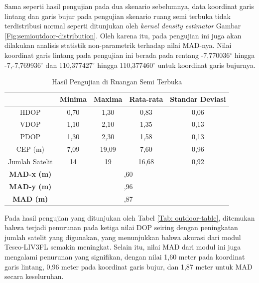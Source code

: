 Sama seperti hasil pengujian pada dua skenario sebelumnya, data koordinat garis lintang dan garis bujur pada pengujian skenario ruang semi terbuka tidak terdistribusi normal seperti ditunjukan oleh \textit{kernel density estimator} Gambar \ref{Fig:semioutdoor-distribution}. Oleh karena itu, pada pengujian ini juga akan dilakukan analisis statistik non-parametrik terhadap nilai MAD-nya. Nilai koordinat garis lintang pada pengujian ini berada pada rentang -7,770036$^{\circ}$ hingga -7,-7,769936$^{\circ}$ dan 110,377427$^{\circ}$ hingga 110,377460$^{\circ}$ untuk koordinat garis bujurnya.

\begin{table}[H]
	\caption{Hasil Pengujian di Ruangan Semi Terbuka}
	\vspace{0.5em}
	\centering
	\begin{tabular}{ccccc}
		\hline
		& \textbf{Minima} & \textbf{Maxima} & \textbf{Rata-rata} & \textbf{Standar Deviasi}\\
		\hline 
		HDOP & 0,70 & 1,30 & 0,83 & 0,06\\
		VDOP & 1,10	& 2,10 & 1,35 & 0,13\\
		PDOP & 1,30	& 2,30 & 1,58 & 0,13\\
		CEP (m) & 7,09	& 19,09 & 7,60 & 0,96\\
		Jumlah Satelit & 14 & 19 & 16,68 & 0,92\\
		\hline
		\textbf{MAD-x (m)} & & \multicolumn{2}{c}{\centering 1,60} & \\
		\hline
		\textbf{MAD-y (m)} & & \multicolumn{2}{c}{\centering 0,96} & \\
		\hline
		\textbf{MAD (m)} & & \multicolumn{2}{c}{\centering 1,87} & \\
		\hline
	\end{tabular}
	\label{Tab: semioutdoor-table}
\end{table}

Pada hasil pengujian yang ditunjukan oleh Tabel \ref{Tab: outdoor-table}, ditemukan bahwa terjadi penurunan pada ketiga nilai DOP seiring dengan peningkatan jumlah satelit yang digunakan, yang menunjukkan bahwa akurasi dari modul Teseo\hyp{}LIV3FL semakin meningkat. Selain itu, nilai MAD dari modul ini juga mengalami penurunan yang signifikan, dengan nilai 1,60 meter pada koordinat garis lintang, 0,96 meter pada koordinat garis bujur, dan 1,87 meter untuk MAD secara keseluruhan.

